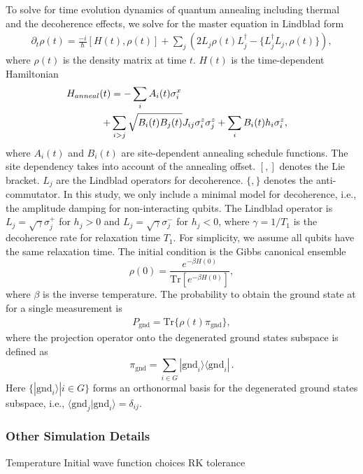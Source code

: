 \documentclass[prd,twocolumn,tightenlines,preprintnumbers,showpacs,superscriptaddress,notitlepage,nofootinbib,eqsecnum,floatfix,longbibliography]{revtex4}
\begin{document}
To solve for time evolution dynamics of quantum annealing including thermal and the decoherence effects, we solve for the master equation in Lindblad form
\begin{align}
    \partial_t \rho (t) =  \frac{-i}{\hbar} [H(t) , \rho(t)] + \sum_j (2L_j \rho(t) L_j^\dagger - \{ L^\dagger_j L_j, \rho(t) \}) ,
\end{align}
where $\rho (t)$ is the density matrix at time $t$.
$H(t)$ is the time-dependent Hamiltonian
\begin{align}
    \label{eq:annealH}
     H_{anneal}(t)&  =  - \sum_i  A_i(t)\sigma^x_i & \notag \\
     +&  \sum_{i>j} \sqrt{B_{i}(t)B_{j}(t)} J_{ij} \sigma^z_i \sigma^z_j +\sum_i B_{i}(t) h_i \sigma^z_i  ,&
\end{align}
where $A_i(t)$ and $B_{i}(t)$ are site-dependent annealing schedule functions.
The site dependency takes into account of the annealing offset.
$[,]$ denotes the Lie bracket.
$L_j$ are the Lindblad operators for decoherence.
$\{, \}$ denotes the anti-commutator.
In this study, we only include a minimal model for decoherence, i.e., the amplitude damping for non-interacting qubits.
The Lindblad operator is $L_j=\sqrt{\gamma} \sigma^{+}_j$ for $h_j>0$ and $L_j=\sqrt{\gamma} \sigma^{-}_j$ for $h_j<0$, where $\gamma = 1/T_1$ is the decoherence rate for relaxation time $T_1$.
For simplicity, we assume all qubits have the same relaxation time.
The initial condition is the Gibbs canonical ensemble
\begin{equation}
    \rho (0) =  \frac{e^{-\beta H(0)}}{\mbox{Tr}[e^{-\beta H(0)}]} ,
\end{equation}
where $\beta$ is the inverse temperature.
The probability to obtain the ground state at for a single measurement is
\begin{align}
    P_{\mbox{gnd}} =  \mbox{Tr} \{  \rho (t) \pi_{\mbox{gnd}} \}  ,
\end{align}
where the projection operator onto the degenerated ground states subspace is defined as
\begin{equation}
	\pi_{\mbox{gnd}}=\sum_{i\in G} |\mbox{gnd}_i\rangle \langle \mbox{gnd}_i|
	\, .
\end{equation}
Here $\{ | \mbox{gnd}_i \rangle | i \in G \}$ forms an orthonormal basis for the degenerated ground states subspace, i.e., $\langle \mbox{gnd}_j | \mbox{gnd}_i \rangle = \delta_{ij}$.

\subsubsection{Other Simulation Details}
Temperature
Initial wave function choices
RK tolerance
\end{document}
